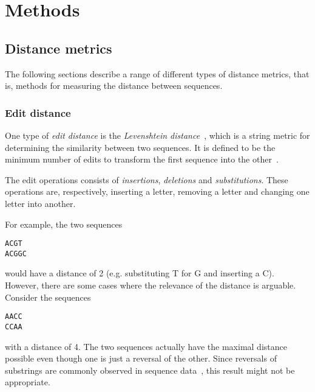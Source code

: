 \section{Methods} \label{sec:methods}

\subsection{Distance metrics}

The following sections describe a range of different types of distance metrics,
that is, methods for measuring the distance between sequences.

\subsubsection{Edit distance}

One type of \emph{edit distance} is the \emph{Levenshtein
distance}~\cite{levenshtein}, which is a string metric for determining the
similarity between two sequences. It is defined to be the minimum number of
edits to transform the first sequence into the other~\cite[p.~52]{dong}.

The edit operations consists of \emph{insertions}, \emph{deletions} and
\emph{substitutions}. These operations are, respectively, inserting a letter,
removing a letter and changing one letter into another.

For example, the two sequences
\begin{center}
  \texttt{ACGT} \\
  \texttt{ACGGC}
\end{center}
would have a distance of 2 (e.g. substituting T for G and inserting a C). However,
there are some cases where the relevance of the distance is arguable. Consider
the sequences
\begin{center}
  \texttt{AACC} \\
  \texttt{CCAA}
\end{center}
with a distance of 4. The two sequences actually have the maximal distance
possible even though one is just a reversal of the other. Since reversals of
substrings are commonly observed in sequence data~\cite{arslan}, this result
might not be appropriate.


